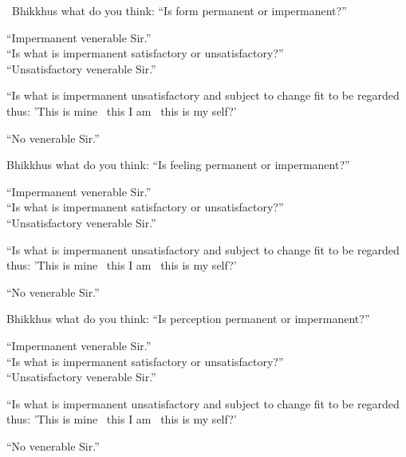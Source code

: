 \begin{english-only-nohang}
  \begin{english-only-hang}
    \anglebracketleft\ \hspace{-0.5mm}Bhikkhus what do you think: \hspace{-0.5mm}\anglebracketright\: ``Is form permanent or impermanent?''
  \end{english-only-hang}
  ``Impermanent venerable Sir.''\\
  ``Is what is impermanent satisfactory or unsatisfactory?''\\
  ``Unsatisfactory venerable Sir.''\\
  \begin{english-hangtogether}
    ``Is what is impermanent unsatisfactory and subject to change fit to be regarded thus: 'This is mine \breathmark\ this I am \breathmark\ this is my self?'
  \end{english-hangtogether}
  ``No venerable Sir.''
\end{english-only-nohang}

\begin{english-only-nohang}
  \begin{english-only-hang}
    Bhikkhus what do you think: ``Is feeling permanent or impermanent?''
  \end{english-only-hang}
  ``Impermanent venerable Sir.''\\
  ``Is what is impermanent satisfactory or unsatisfactory?''\\
  ``Unsatisfactory venerable Sir.''\\
  \begin{english-hangtogether}
    ``Is what is impermanent unsatisfactory and subject to change fit to be regarded thus: 'This is mine \breathmark\ this I am \breathmark\ this is my self?'
  \end{english-hangtogether}
  ``No venerable Sir.''
\end{english-only-nohang}

\begin{english-only-nohang}
  \begin{english-only-hang}
    Bhikkhus what do you think: ``Is perception permanent or impermanent?''
  \end{english-only-hang}
  ``Impermanent venerable Sir.''\\
  ``Is what is impermanent satisfactory or unsatisfactory?''\\
  ``Unsatisfactory venerable Sir.''\\
  \begin{english-hangtogether}
    ``Is what is impermanent unsatisfactory and subject to change fit to be regarded thus: 'This is mine \breathmark\ this I am \breathmark\ this is my self?'
  \end{english-hangtogether}
  ``No venerable Sir.''
\end{english-only-nohang}


